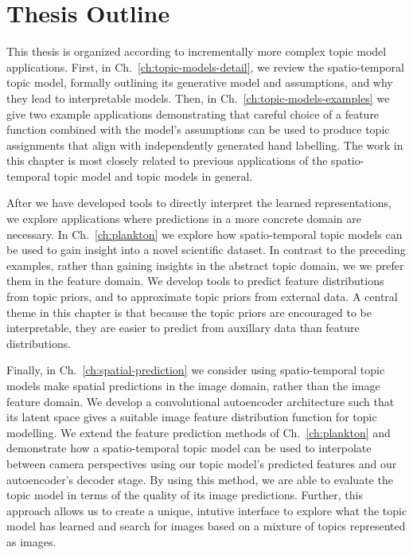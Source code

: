 \section{Thesis Outline}

This thesis is organized according to incrementally more complex topic model applications. First, in Ch.~\ref{ch:topic-models-detail}, we review the spatio-temporal topic model, formally outlining its generative model and assumptions, and why they lead to interpretable models. Then, in Ch.~\ref{ch:topic-models-examples} we give two example applications demonstrating that careful choice of a feature function combined with the model's assumptions can be used to produce topic assignments that align with independently generated hand labelling. The work in this chapter is most closely related to previous applications of the spatio-temporal topic model and topic models in general.

After we have developed tools to directly interpret the learned representations, we explore applications where predictions in a more concrete domain are necessary. In Ch.~\ref{ch:plankton} we explore how spatio-temporal topic models can be used to gain insight into a novel scientific dataset. In contrast to the preceding examples, rather than gaining insights in the abstract topic domain, we we prefer them in the feature domain. We develop tools to predict feature distributions from topic priors, and to approximate topic priors from external data. A central theme in this chapter is that because the topic priors are encouraged to be interpretable, they are easier to predict from auxillary data than feature distributions.

Finally, in Ch.~\ref{ch:spatial-prediction} we consider using spatio-temporal topic models make spatial predictions in the image domain, rather than the image feature domain. We develop a convolutional autoencoder architecture such that its latent space gives a suitable image feature distribution function for topic modelling. We extend the feature prediction methods of Ch.~\ref{ch:plankton} and demonstrate how a spatio-temporal topic model can be used to interpolate between camera perspectives using our topic model's predicted features and our autoencoder's decoder stage. By using this method, we are able to evaluate the topic model in terms of the quality of its image predictions. Further, this approach allows us to create a unique, intutive interface to explore what the topic model has learned and search for images based on a mixture of topics represented as images.
